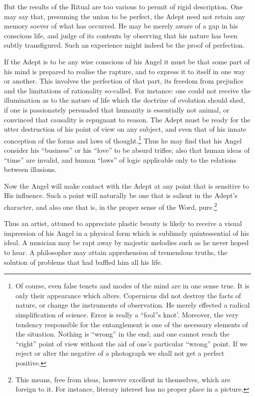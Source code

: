 But the results of the Ritual are too various to permit of rigid description. One may say that, presuming the union to be perfect, the Adept need not retain any memory soever of what has occurred. He may be merely aware of a gap in his conscious life, and judge of its contents by observing that his nature has been subtly transfigured. Such an experience might indeed be the proof of perfection.

If the Adept is to be any wise conscious of his Angel it must be that some part of his mind is prepared to realise the rapture, and to express it to itself in one way or another. This involves the perfection of that part, its freedom from prejudice and the limitations of rationality so-called. For instance: one could not receive the illumination as to the nature of life which the doctrine of evolution should shed, if one is passionately persuaded that humanity is essentially not animal, or convinced that causality is repugnant to reason. The Adept must be ready for the utter destruction of his point of view on any subject, and even that of his innate conception of the forms and laws of thought.\footnote{Of course, even false tenets and modes of the mind are in one sense true. It is only their appearance which alters. Copernicus did not destroy the facts of nature, or change the instruments of observation. He merely effected a radical simplification of science. Error is really a \enquote{fool}s knot'. Moreover, the very tendency responsible for the entanglement is one of the necessary elements of the situation. Nothing is \enquote{wrong} in the end; and one cannot reach the \enquote{right} point of view without the aid of one’s particular \enquote{wrong} point. If we reject or alter the negative of a photograph we shall not get a perfect positive.} Thus he may find that his Angel consider his \enquote{business} or his \enquote{love} to be absurd trifles; also that human ideas of \enquote{time} are invalid, and human \enquote{laws} of logic applicable only to the relations between illusions.

Now the Angel will make contact with the Adept at any point that is sensitive to His influence. Such a point will naturally be one that is salient in the Adept’s character, and also one that is, in the proper sense of the Word, pure.\footnote{This means, free from ideas, however excellent in themselves, which are foreign to it. For instance, literary interest has no proper place in a picture.}

Thus an artist, attuned to appreciate plastic beauty is likely to receive a visual impression of his Angel in a physical form which is sublimely quintessential of his ideal. A musician may be rapt away by majestic melodies such as he never hoped to hear. A philosopher may attain apprehension of tremendous truths, the solution of problems that had baffled him all his life.

